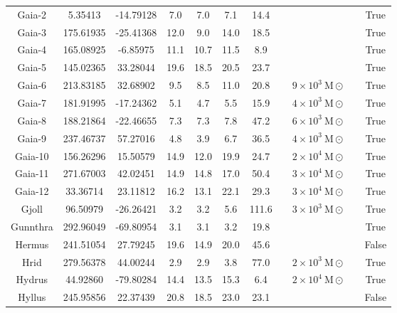 \begin{table}
\begin{tabular}{ccccccccccc}
Gaia-2 & 5.35413 & -14.79128 & 7.0 & 7.0 & 7.1 & 14.4 & \citet{ibata:2021} & &  & True \\
Gaia-3 & 175.61935 & -25.41368 & 12.0 & 9.0 & 14.0 & 18.5 & \citet{malhan:2018} & &  & True \\
Gaia-4 & 165.08925 & -6.85975 & 11.1 & 10.7 & 11.5 & 8.9 & \citet{malhan:2018} & &  & True \\
Gaia-5 & 145.02365 & 33.28044 & 19.6 & 18.5 & 20.5 & 23.7 & \citet{malhan:2018} & &  & True \\
Gaia-6 & 213.83185 & 32.68902 & 9.5 & 8.5 & 11.0 & 20.8 & \citet{ibata:2023} & $9 \times 10^{3}~\mathrm{M}\odot$ &  & True \\
Gaia-7 & 181.91995 & -17.24362 & 5.1 & 4.7 & 5.5 & 15.9 & \citet{ibata:2023} & $4 \times 10^{3}~\mathrm{M}\odot$ &  & True \\
Gaia-8 & 188.21864 & -22.46655 & 7.3 & 7.3 & 7.8 & 47.2 & \citet{ibata:2023} & $6 \times 10^{3}~\mathrm{M}\odot$ &  & True \\
Gaia-9 & 237.46737 & 57.27016 & 4.8 & 3.9 & 6.7 & 36.5 & \citet{ibata:2023} & $4 \times 10^{3}~\mathrm{M}\odot$ &  & True \\
Gaia-10 & 156.26296 & 15.50579 & 14.9 & 12.0 & 19.9 & 24.7 & \citet{ibata:2023} & $2 \times 10^{4}~\mathrm{M}\odot$ &  & True \\
Gaia-11 & 271.67003 & 42.02451 & 14.9 & 14.8 & 17.0 & 50.4 & \citet{ibata:2023} & $3 \times 10^{4}~\mathrm{M}\odot$ &  & True \\
Gaia-12 & 33.36714 & 23.11812 & 16.2 & 13.1 & 22.1 & 29.3 & \citet{ibata:2023} & $3 \times 10^{4}~\mathrm{M}\odot$ &  & True \\
Gjoll & 96.50979 & -26.26421 & 3.2 & 3.2 & 5.6 & 111.6 & \citet{ibata:2023} & $3 \times 10^{3}~\mathrm{M}\odot$ &  & True \\
Gunnthra & 292.96049 & -69.80954 & 3.1 & 3.1 & 3.2 & 19.8 & \citet{ibata:2021} & &  & True \\
Hermus & 241.51054 & 27.79245 & 19.6 & 14.9 & 20.0 & 45.6 & \citet{grillmair:2014} & &  & False \\
Hrid & 279.56378 & 44.00244 & 2.9 & 2.9 & 3.8 & 77.0 & \citet{ibata:2023} & $2 \times 10^{3}~\mathrm{M}\odot$ &  & True \\
Hydrus & 44.92860 & -79.80284 & 14.4 & 13.5 & 15.3 & 6.4 & \citet{ibata:2023} & $2 \times 10^{4}~\mathrm{M}\odot$ &  & True \\
Hyllus & 245.95856 & 22.37439 & 20.8 & 18.5 & 23.0 & 23.1 & \citet{grillmair:2014} & &  & False \\

\end{tabular}
\end{table}
